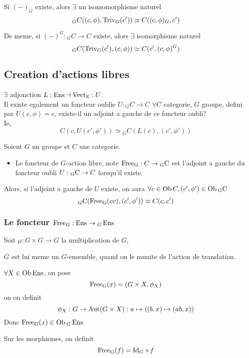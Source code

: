 \documentclass[../main.tex]{subfiles}
\begin{document}
	Si $( -)_G$  existe, alors $\exists $ un isomomorphisme naturel
	\[ 
	{ } _G C( ( c,\phi) , \operatorname{Triv}_G( c') ) \simeq C( ( c,\phi) _G, c') 
	\]
	
	De meme, si $( -)^{G}: { } _GC \to C$ existe, alors $\exists $ isomorphisme naturel
	\[ 
	{ } _G C( \operatorname{Triv}_G( c'), ( c,\phi) ) \simeq C( c', ( c,\phi)^{G})  
	\]
	
\subsection{Creation d'actions libres}
$\exists$ adjonction $  L:\operatorname{Ens} \dashv \operatorname{Vect}_{\mathbb{K}}: U $.\\
Il existe egalement un foncteur oublie $U: { } _G C\to C$ $\forall C $ categorie, $G$ groupe, defini par $U( c,\phi) = c$, existe-il un adjoint a gauche de ce foncteur oubli?\\
Ie,
\[ 
C( c, U( c',\phi') ) \simeq { } _G C( L( c) , ( c',\phi') ) 
\]

\begin{defn}
	Soient $G$ un groupe et $C$ une categorie.
	\begin{itemize}
	\item Le foncteur de $G$-action libre, note $\operatorname{Free_{G}}: C\to \operatorname{{}_GC}$ est l'adjoint a gauche du foncteur oubli $U: \operatorname{{}_GC}\to C$ lorsqu'il existe.
	\end{itemize}
	Alors, si l'adjoint a gauche de $U$ existe, on aura $\forall c \in \operatorname{Ob} C, ( c',\phi') \in \operatorname{Ob} \operatorname{{}_GC}$ 
	\[ 
	\operatorname{{}_GC} ( \operatorname{Free_{G}} ( cv) , ( c',\phi') ) \simeq C( c,c') 
	\]
	
	
\end{defn}
\subsubsection{Le foncteur $\operatorname{Free_{G}}: \operatorname{Ens} \to { }_G\operatorname{Ens}$ }
Soit $\mu: G\times G \to G$ la multiplication de $G$, 
\begin{rmq}
$G$ est lui meme un $G$-ensemble, quand on le munite de l'action de translation.
\end{rmq}
$\forall X\in\operatorname{Ob}\operatorname{Ens}$, on pose
\[ 
\operatorname{Free_{G}}( x) = ( G\times X, \phi_X) 
\]
on on definit
\[ 
\phi_X: G\to \operatorname{Aut}( G\times X) : a \mapsto ( ( b,x) \mapsto ( ab,x) ) 
\]
Donc $\operatorname{Free}_G( x) \in \operatorname{Ob} { }_G\operatorname{Ens}$ 		

Sur les morphismes, on definit
\[ 
\operatorname{Free_{G}}( f)  = \operatorname{Id}_G \times f
\]
\end{document}
